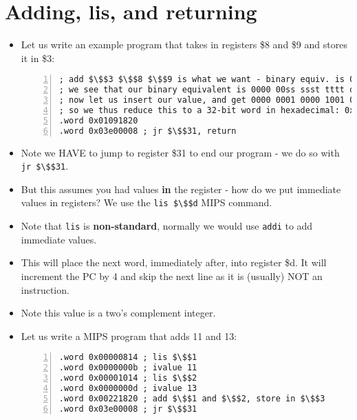 \documentclass[12pt]{article}
\begin{document}
\section{Adding, lis, and returning}
\begin{itemize}
    \item Let us write an example program that takes in registers \$8 and \$9 and stores it in \$3:
        \begin{lstlisting}[mathescape, numbers=left, breaklines=true]
; add $\$$3 $\$$8 $\$$9 is what we want - binary equiv. is 00011, 01000, 01001, respectively.
; we see that our binary equivalent is 0000 00ss ssst tttt dddd d000 0010 0000
; now let us insert our value, and get 0000 0001 0000 1001 0001 1000 0010 0000
; so we thus reduce this to a 32-bit word in hexadecimal: 0x01091820
.word 0x01091820
.word 0x03e00008 ; jr $\$$31, return
        \end{lstlisting}
    \item Note we HAVE to jump to register \$31 to end our program - we do so with \lstinline[mathescape]{jr $\$$31}.
    \item But this assumes you had values \textbf{in} the register - how do we put immediate values in registers?  We use the \lstinline[mathescape]{lis $\$$d} MIPS command. 
    \item Note that \lstinline{lis} is \textbf{non-standard}, normally we would use \lstinline{addi} to add immediate values. 
    \item This will place the next word, immediately after, into register \$d.  It will increment the PC by 4 and skip the next line as it is (usually) NOT an instruction.
    \item Note this value is a two's complement integer.
    \item Let us write a MIPS program that adds 11 and 13:
    \begin{lstlisting}[mathescape, numbers=left]
.word 0x00000814 ; lis $\$$1
.word 0x0000000b ; ivalue 11
.word 0x00001014 ; lis $\$$2
.word 0x0000000d ; ivalue 13
.word 0x00221820 ; add $\$$1 and $\$$2, store in $\$$3
.word 0x03e00008 ; jr $\$$31
    \end{lstlisting}
\end{itemize}
\end{document}
